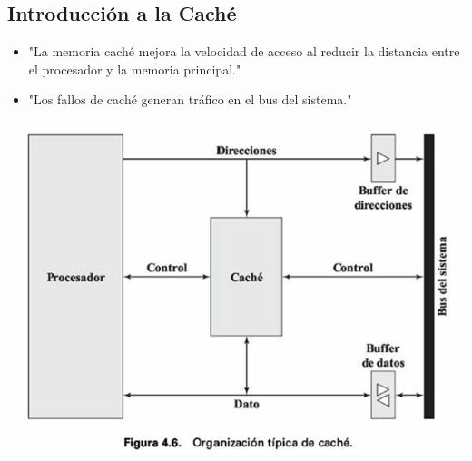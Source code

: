 \documentclass[presentation]{beamer}
\begin{document}
\subsection{Introducción a la Caché}
\label{sec:orgf497d53}
\begin{itemize}
\item "La memoria caché mejora la velocidad de acceso al reducir la distancia entre el procesador y la memoria principal."
\item "Los fallos de caché generan tráfico en el bus del sistema."
\end{itemize}

\begin{center}
\includegraphics[width=.9\linewidth]{./Imagenes/fig4.6.png}
\end{center}
\end{document}

